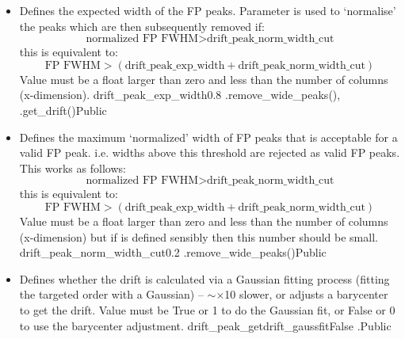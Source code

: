 \begin{itemize}
\item \label{text:drift_peak_exp_width} 
{Defines the expected width of the FP peaks. Parameter is used to `normalise' the peaks which are then subsequently removed if:
\begin{equation}
\text{normalized FP FWHM} > \text{drift\_peak\_norm\_width\_cut}
\end{equation}
this is equivalent to:
\begin{equation}
\text{FP FWHM} > (\text{drift\_peak\_exp\_width} + \text{drift\_peak\_norm\_width\_cut})
\end{equation}
Value must be a float larger than zero and less than the number of columns (x-dimension).
}
{drift\_peak\_exp\_width}{0.8}
{\calDRIFTPEAK}{\constantsfile}{\spirouRV.remove\_wide\_peaks(), \spirouRV.get\_drift()}{Public}

\item {}
{Defines the maximum `normalized' width of FP peaks that is acceptable for a valid FP peak. i.e. widths above this threshold are rejected as valid FP peaks.
This works as follows:
\begin{equation}
\text{normalized FP FWHM} > \text{drift\_peak\_norm\_width\_cut}
\end{equation}
this is equivalent to:
\begin{equation}
\text{FP FWHM} > (\text{drift\_peak\_exp\_width} + \text{drift\_peak\_norm\_width\_cut})
\end{equation}
Value must be a float larger than zero and less than the number of columns (x-dimension) but if  is defined sensibly then this number should be small.
}
{drift\_peak\_norm\_width\_cut}{0.2}
{\calDRIFTPEAK}{\constantsfile}{\spirouRV.remove\_wide\_peaks()}{Public}

\item {}
{Defines whether the drift is calculated via a Gaussian fitting process (fitting the targeted order with a Gaussian) -- $\sim\times$10 slower, or adjusts a barycenter to get the drift. Value must be True or 1 to do the Gaussian fit, or False or 0 to use the barycenter adjustment.}
{drift\_peak\_getdrift\_gaussfit}{False}
{\calDRIFTPEAK}{\constantsfile}{\calDRIFTPEAK.\progMAIN}{Public}


\end{itemize}
